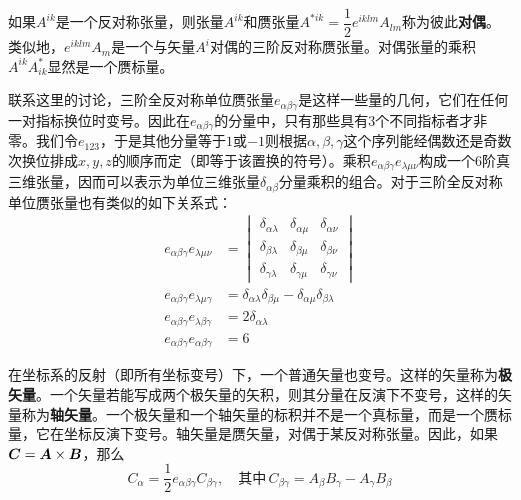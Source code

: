 如果$A^{ik}$是一个反对称张量，则张量$A^{ik}$和赝张量$A^{*ik} = \dfrac12 e^{iklm}A_{lm}$称为彼此{\bf 对偶}。类似地，$e^{iklm}A_m$是一个与矢量$A^i$对偶的三阶反对称赝张量。对偶张量的乘积$A^{ik}A^*_{ik}$显然是一个赝标量。

联系这里的讨论，三阶全反对称单位赝张量$e_{\alpha\beta\gamma}$是这样一些量的几何，它们在任何一对指标换位时变号。因此在$e_{\alpha\beta\gamma}$的分量中，只有那些具有3个不同指标者才非零。我们令$e_{123}$，于是其他分量等于$1$或$-1$则根据$\alpha,\beta,\gamma$这个序列能经偶数还是奇数次换位排成$x,y,z$的顺序而定（即等于该置换的符号）。乘积$e_{\alpha\beta\gamma}e_{\lambda\mu\nu}$构成一个6阶真三维张量，因而可以表示为单位三维张量$\delta_{\alpha\beta}$分量乘积的组合。对于三阶全反对称单位赝张量也有类似的如下关系式：
\begin{align}
	e_{\alpha\beta\gamma}e_{\lambda\mu\nu} & = \begin{vmatrix} \delta_{\alpha\lambda} & \delta_{\alpha\mu} & \delta_{\alpha\nu} \\ \delta_{\beta\lambda} & \delta_{\beta\mu} & \delta_{\beta\nu} \\ \delta_{\gamma\lambda} & \delta_{\gamma\mu} & \delta_{\gamma\nu} \end{vmatrix} \\
	e_{\alpha\beta\gamma}e_{\lambda\mu\gamma} & = \delta_{\alpha\lambda}\delta_{\beta\mu} - \delta_{\alpha\mu}\delta_{\beta\lambda} \\
	e_{\alpha\beta\gamma}e_{\lambda\beta\gamma} & = 2\delta_{\alpha\lambda} \\
	e_{\alpha\beta\gamma}e_{\alpha\beta\gamma} & = 6
\end{align}

在坐标系的反射（即所有坐标变号）下，一个普通矢量也变号。这样的矢量称为{\bf 极矢量}。一个矢量若能写成两个极矢量的矢积，则其分量在反演下不变号，这样的矢量称为{\bf 轴矢量}。一个极矢量和一个轴矢量的标积并不是一个真标量，而是一个赝标量，它在坐标反演下变号。轴矢量是赝矢量，对偶于某反对称张量。因此，如果$\boldsymbol{C} = \boldsymbol{A} \times \boldsymbol{B}$，那么
\begin{equation*}
	C_\alpha = \frac12 e_{\alpha\beta\gamma}C_{\beta\gamma},\quad \text{其中}\,C_{\beta\gamma} = A_\beta B_\gamma - A_\gamma B_\beta
\end{equation*}

